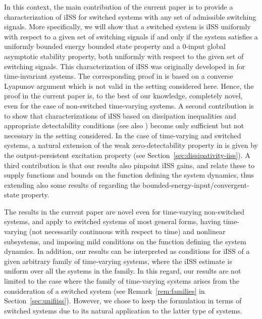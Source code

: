 \documentclass[9pt,final,journal]{IEEEtran}
\begin{document}
In this context, the main contribution of the current paper is to provide a characterization of iISS for switched systems with any set of admissible switching signals. More specifically, we will show that a switched system is iISS uniformly with respect to a given set of switching signals if and only if the system satisfies a uniformly bounded energy bounded state \cite{angson_dc00} property and a 0-input global asymptotic stability property, both uniformly with respect to the given set of switching signals. This characterization of iISS was originally developed in \cite{angson_dc00} for time-invariant systems. The corresponding proof in \cite{angson_dc00} is based on a converse Lyapunov argument which is not valid in the setting considered here. Hence, the proof in the current paper is, to the best of our knowledge, completely novel, even for the case of non-switched time-varying systems. A second contribution is to show that characterizations of iISS based on dissipation inequalities and appropriate detectability conditions \cite{angson_tac00} (see also \cite{wanwei_tac08,jayrya_tac10}) become only sufficient but not necessary in the setting considered. In the case of time-varying and switched systems, a natural extension of the weak zero-detectability property in \cite{angson_tac00} is given by the output-persistent excitation property \cite{leejia_tac08,leetan_tac15} (see Section~\ref{sec:dissipativity-iiss}). A third contribution is that our results also pinpoint iISS gains, and relate these to supply functions and bounds on the function defining the system dynamics, thus extending also some results of \cite{jayrya_tac10} regarding the bounded-energy-input/convergent-state property. 

The results in the current paper are novel even for time-varying non-switched systems, and apply to switched systems of most general forms, having time-varying (not necessarily continuous with respect to time) and nonlinear subsystems, and imposing mild conditions on the function defining the system dynamics. In addition, our results can be interpreted as conditions for iISS of a given arbitrary family of time-varying systems, where the iISS estimate is uniform over all the systems in the family. In this regard, our results are not limited to the case where the family of time-varying systems arises from the consideration of a switched system (see Remark~\ref{rem:families} in Section~\ref{sec:unifiiss}). However, we chose to keep the formulation in terms of switched systems due to its natural application to the latter type of systems.
\end{document}
